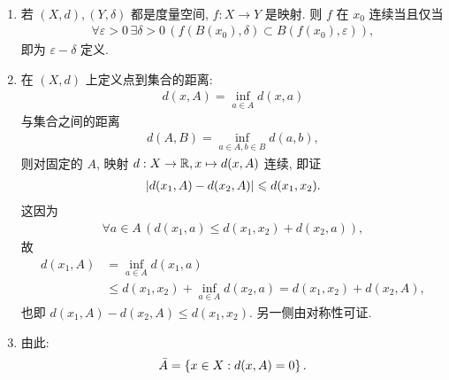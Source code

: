     \begin{Example}[度量空间之间的连续映射]
        ~
        \begin{enumerate}
            \item 若 $ (X, d), (Y, \delta) $ 都是度量空间, $ f:X\to Y $ 是映射. 则 $ f $ 在 $ x_{0} $ 连续当且仅当
            \begin{align*}
                \forall \varepsilon>0\,\exists\delta>0\,(f(B(x_{0}), \delta)\subset B(f(x_{0}), \varepsilon)),
            \end{align*}
            即为 $ \varepsilon-\delta $ 定义. 
            \item 在 $ (X, d) $ 上定义点到集合的距离:
            \begin{align*}
                d(x, A)=\inf_{a\in A}d(x, a)
            \end{align*}
            与集合之间的距离
            \begin{align*}
                d(A, B)=\inf_{a\in A, b\in B}d(a, b),
            \end{align*}
            则对固定的 $ A $, 映射 $ d: X\to\mathbb{R}, x\mapsto d(x, A) $ 连续, 即证
            \begin{align*}
                \left| d(x_{1}, A)-d(x_{2}, A) \right| \leqslant d(x_{1}, x_{2}).
            \end{align*}
            这因为
            \begin{align*}
                \forall a\in A\,(d(x_{1}, a)\leqslant d(x_{1}, x_{2})+d(x_{2}, a)), 
            \end{align*}
            故
            \begin{align*}
                d(x_{1}, A) & =\inf_{a\in A}d(x_{1}, a)\\
                & \leqslant d(x_{1}, x_{2})+\inf_{a\in A}d(x_{2}, a)=d(x_{1}, x_{2})+d(x_{2}, A),
            \end{align*}
            也即 $ d(x_{1}, A)-d(x_{2}, A)\leqslant d(x_{1}, x_{2}) $. 另一侧由对称性可证. 
            \item 由此:
            \begin{align*}
                \bar{A}=\left\{ x\in X: d(x, A)=0 \right\}.
            \end{align*}
        \end{enumerate}
    \end{Example}

